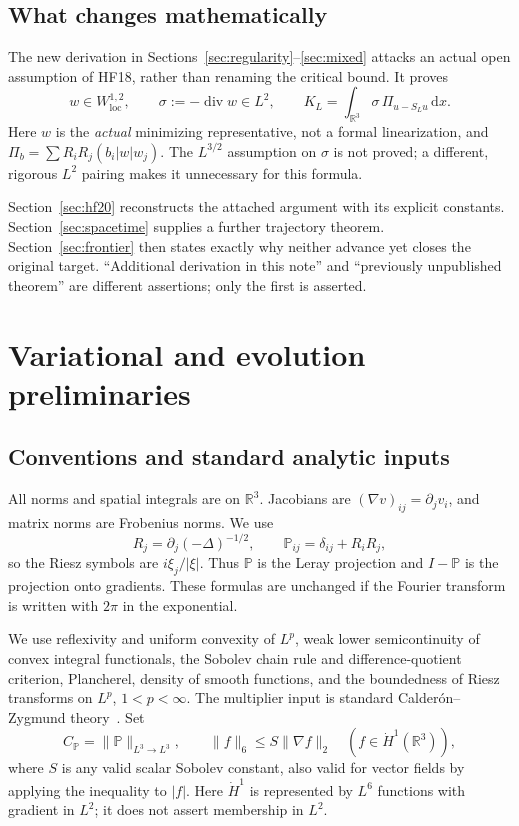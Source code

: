 \documentclass[11pt,a4paper]{article}
\theoremstyle{definition}
\newcommand{\R}{\mathbb R}
\newcommand{\PP}{\mathbb P}
\newcommand{\dd}{\,\mathrm dx}
\DeclareMathOperator{\diver}{div}
\begin{document}
\subsection{What changes mathematically}
The new derivation in Sections~\ref{sec:regularity}--\ref{sec:mixed} attacks an actual open assumption of HF18, rather than renaming the critical bound. It proves
\begin{equation}\label{eq:advance-summary}
 w\in W^{1,2}_{\mathrm{loc}},\qquad
 \sigma:=-\diver w\in L^2,
 \qquad K_L=\int_{\R^3}\sigma\,\Pi_{u-S_Lu}\dd.
\end{equation}
Here $w$ is the \emph{actual} minimizing representative, not a formal linearization, and $\Pi_b=\sum R_iR_j(b_i|w|w_j)$. The $L^{3/2}$ assumption on $\sigma$ is not proved; a different, rigorous $L^2$ pairing makes it unnecessary for this formula.

Section~\ref{sec:hf20} reconstructs the attached argument with its explicit constants. Section~\ref{sec:spacetime} supplies a further trajectory theorem. Section~\ref{sec:frontier} then states exactly why neither advance yet closes the original target. ``Additional derivation in this note'' and ``previously unpublished theorem'' are different assertions; only the first is asserted.

\section{Variational and evolution preliminaries}\label{sec:prelim}

\subsection{Conventions and standard analytic inputs}
All norms and spatial integrals are on $\R^3$. Jacobians are $(\nabla v)_{ij}=\partial_jv_i$, and matrix norms are Frobenius norms. We use
\[
 R_j=\partial_j(-\Delta)^{-1/2},\qquad
 \PP_{ij}=\delta_{ij}+R_iR_j,
\]
so the Riesz symbols are $i\xi_j/|\xi|$. Thus $\PP$ is the Leray projection and $I-\PP$ is the projection onto gradients. These formulas are unchanged if the Fourier transform is written with $2\pi$ in the exponential.

We use reflexivity and uniform convexity of $L^p$, weak lower semicontinuity of convex integral functionals, the Sobolev chain rule and difference-quotient criterion, Plancherel, density of smooth functions, and the boundedness of Riesz transforms on $L^p$, $1<p<\infty$. The multiplier input is standard Calder\'on--Zygmund theory~\cite{Stein}. Set
\[
 C_{\PP}=\|\PP\|_{L^3\to L^3},\qquad
 \|f\|_6\le S\|\nabla f\|_2\quad(f\in\dot H^1(\R^3)),
\]
where $S$ is any valid scalar Sobolev constant, also valid for vector fields by applying the inequality to $|f|$. Here $\dot H^1$ is represented by $L^6$ functions with gradient in $L^2$; it does not assert membership in $L^2$.
\end{document}
